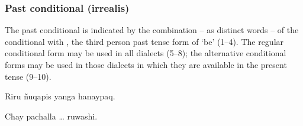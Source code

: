 \subsubsection{Past conditional (irrealis)}
The past conditional is indicated by the combination -- as distinct words -- of the conditional with , the third person past tense form of  `be' (1--4). The regular conditional form may be used in all dialects (5--8); the alternative conditional forms may be used in those dialects in which they are available in the present tense (9--10). 


%
{Riru  \~nuqapis yanga hanaypaq.}%
{}%
{}{}%

%
{Chay pachalla \dots{} ruwashi.}%
{}%
{}{}%

